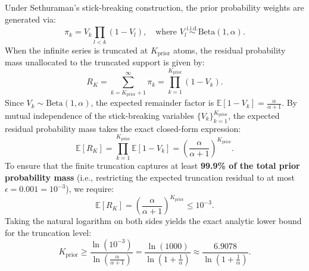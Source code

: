 \documentclass[10pt]{article}
\begin{document}
Under Sethuraman's stick-breaking construction, the prior probability weights are generated via:
\begin{equation}
\pi_k = V_k \prod_{l < k} (1 - V_l), \quad \text{where } V_l \stackrel{\text{i.i.d.}}{\sim} \mathrm{Beta}(1, \alpha).
\end{equation}
When the infinite series is truncated at $K_{\text{prior}}$ atoms, the residual probability mass unallocated to the truncated support is given by:
\begin{equation}
R_{K} = \sum_{k = K_{\text{prior}} + 1}^\infty \pi_k = \prod_{k=1}^{K_{\text{prior}}} (1 - V_k).
\end{equation}
Since $V_k \sim \mathrm{Beta}(1, \alpha)$, the expected remainder factor is $\mathbb{E}[1 - V_k] = \frac{\alpha}{\alpha + 1}$. By mutual independence of the stick-breaking variables $\{V_k\}_{k=1}^{K_{\text{prior}}}$, the expected residual probability mass takes the exact closed-form expression:
\begin{equation}
\mathbb{E}[R_K] = \prod_{k=1}^{K_{\text{prior}}} \mathbb{E}[1 - V_k] = \left( \frac{\alpha}{\alpha + 1} \right)^{K_{\text{prior}}}.
\end{equation}
To ensure that the finite truncation captures at least \textbf{99.9\% of the total prior probability mass} (i.e., restricting the expected truncation residual to at most $\epsilon = 0.001 = 10^{-3}$), we require:
\begin{equation}
\mathbb{E}[R_K] = \left( \frac{\alpha}{\alpha + 1} \right)^{K_{\text{prior}}} \le 10^{-3}.
\end{equation}
Taking the natural logarithm on both sides yields the exact analytic lower bound for the truncation level:
\begin{equation}
K_{\text{prior}} \ge \frac{\ln(10^{-3})}{\ln\left( \frac{\alpha}{\alpha + 1} \right)} = \frac{\ln(1000)}{\ln\left( 1 + \frac{1}{\alpha} \right)} \approx \frac{6.9078}{\ln\left( 1 + \frac{1}{\alpha} \right)}.
\label{eq:999-truncation-bound}
\end{equation}
\end{document}
